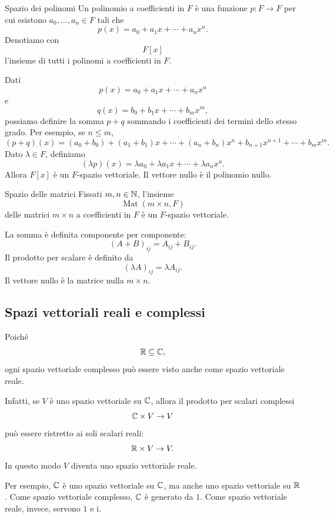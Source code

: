 \documentclass[a4paper]{article}
\begin{document}
\begin{snippetexample}{Spazio dei polinomi}
    Un polinomio a coefficienti in \(F\) è una funzione \(p:F\to F\) per cui esistono \(a_0,\ldots,a_n\in F\) tali che
    \[
        p(x)=a_0+a_1x+\cdots+a_nx^n.
    \]
    Denotiamo con
    \[
        F[x]
    \]
    l'insieme di tutti i polinomi a coefficienti in \(F\).

    Dati
    \[
        p(x)=a_0+a_1x+\cdots+a_nx^n
    \]
    e
    \[
        q(x)=b_0+b_1x+\cdots+b_mx^m,
    \]
    possiamo definire la somma \(p+q\) sommando i coefficienti dei termini dello stesso grado. Per esempio, se \(n\leq m\),
    \[
        (p+q)(x)
        =
        (a_0+b_0)+(a_1+b_1)x+\cdots+(a_n+b_n)x^n
        +b_{n+1}x^{n+1}+\cdots+b_mx^m.
    \]
    Dato \(\lambda\in F\), definiamo
    \[
        (\lambda p)(x)
        =
        \lambda a_0+\lambda a_1x+\cdots+\lambda a_nx^n.
    \]
    Allora \(F[x]\) è un \(F\)-spazio vettoriale. Il vettore nullo è il polinomio nullo.
\end{snippetexample}

\begin{snippetexample}{Spazio delle matrici}
    Fissati \(m,n\in\mathbb{N}\), l'insieme
    \[
        \operatorname{Mat}(m\times n,F)
    \]
    delle matrici \(m\times n\) a coefficienti in \(F\) è un \(F\)-spazio vettoriale.

    La somma è definita componente per componente:
    \[
        (A+B)_{ij}=A_{ij}+B_{ij}.
    \]
    Il prodotto per scalare è definito da
    \[
        (\lambda A)_{ij}=\lambda A_{ij}.
    \]
    Il vettore nullo è la matrice nulla \(m\times n\).
\end{snippetexample}

\subsection{Spazi vettoriali reali e complessi}

Poiché
\[
    \mathbb{R}\subseteq\mathbb{C},
\]
ogni spazio vettoriale complesso può essere visto anche come spazio vettoriale reale.

Infatti, se \(V\) è uno spazio vettoriale su \(\mathbb{C}\), allora il prodotto per scalari complessi
\[
    \mathbb{C}\times V\to V
\]
può essere ristretto ai soli scalari reali:
\[
    \mathbb{R}\times V\to V.
\]
In questo modo \(V\) diventa uno spazio vettoriale reale.

Per esempio, \(\mathbb{C}\) è uno spazio vettoriale su \(\mathbb{C}\), ma anche uno spazio vettoriale su \(\mathbb{R}\). Come spazio vettoriale complesso, \(\mathbb{C}\) è generato da \(1\). Come spazio vettoriale reale, invece, servono \(1\) e \(\mathrm{i}\).
\end{document}
